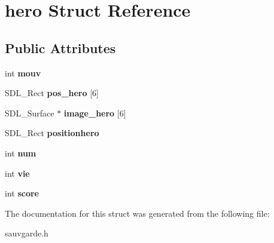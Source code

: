 \hypertarget{structhero}{}\section{hero Struct Reference}
\label{structhero}
\subsection*{Public Attributes}
\begin{DoxyCompactItemize}
\item 
\mbox{\label{structhero_a71888c85e435507ee5c043644d24de22}} 
int {\bfseries mouv}
\item 
\mbox{\label{structhero_a59c4a8de39cbd580177439db6950628b}} 
S\+D\+L\+\_\+\+Rect {\bfseries pos\+\_\+hero} \mbox{[}6\mbox{]}
\item 
\mbox{\label{structhero_adf341f17190d1035dbb72478abf594a8}} 
S\+D\+L\+\_\+\+Surface $\ast$ {\bfseries image\+\_\+hero} \mbox{[}6\mbox{]}
\item 
\mbox{\label{structhero_ac00c690d14ead4118a92d604f8885761}} 
S\+D\+L\+\_\+\+Rect {\bfseries positionhero}
\item 
\mbox{\label{structhero_af06faec4fa53bb156b06d7a919f3df15}} 
int {\bfseries num}
\item 
\mbox{\label{structhero_a5887140c26217e8f45870ee09224ff94}} 
int {\bfseries vie}
\item 
\mbox{\label{structhero_ad95606e4c167095066a7d314620d99b5}} 
int {\bfseries score}
\end{DoxyCompactItemize}


The documentation for this struct was generated from the following file\+:\begin{DoxyCompactItemize}
\item 
sauvgarde.\+h\end{DoxyCompactItemize}
